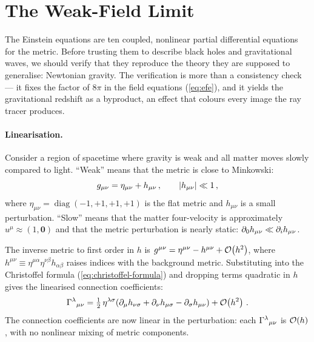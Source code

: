 \section{The Weak-Field Limit}
\label{sec:gr-weak-field}

The Einstein equations are ten coupled, nonlinear partial differential
equations for the metric.  Before trusting them to describe black holes
and gravitational waves, we should verify that they reproduce the theory
they are supposed to generalise: Newtonian gravity.  The verification is
more than a consistency check --- it fixes the factor of $8\pi$ in the
field equations (\cref{eq:efe}), and it yields the gravitational
redshift as a byproduct, an effect that colours every image the ray
tracer produces.

\paragraph{Linearisation.}

Consider a region of spacetime where gravity is weak and all matter
moves slowly compared to light.  ``Weak'' means that the metric is
close to Minkowski:
%
\begin{equation}
  g_{\mu\nu} = \eta_{\mu\nu} + h_{\mu\nu} \,,
  \qquad \left\lvert h_{\mu\nu} \right\rvert \ll 1 \,,
  \label{eq:weak-field-metric}
\end{equation}
%
where $\eta_{\mu\nu} = \operatorname{diag}(-1,+1,+1,+1)$ is the flat
metric and $h_{\mu\nu}$ is a small perturbation.  ``Slow'' means that
the matter four-velocity is approximately
$u^\mu \approx (1,\mathbf{0})$ and that the metric perturbation is
nearly static: $\partial_{0} h_{\mu\nu} \ll \partial_{i} h_{\mu\nu}$.

The inverse metric to first order in $h$ is
$g^{\mu\nu} = \eta^{\mu\nu} - h^{\mu\nu} + \mathcal{O}\!\left(h^2\right)$, where
$h^{\mu\nu} \equiv \eta^{\mu\alpha}\eta^{\nu\beta}h_{\alpha\beta}$
raises indices with the background metric.  Substituting into the
Christoffel formula (\cref{eq:christoffel-formula}) and dropping terms
quadratic in $h$ gives the linearised connection coefficients:
%
\begin{equation}
  \Gamma^{\lambda}{}_{\mu \nu}
    = \tfrac{1}{2}\,\eta^{\lambda\sigma}\!\left(
        \partial_{\mu} h_{\nu\sigma}
      + \partial_{\nu} h_{\mu\sigma}
      - \partial_{\sigma} h_{\mu\nu}
    \right) + \mathcal{O}\!\left(h^2\right) \,.
  \label{eq:christoffel-linearised}
\end{equation}
%
The connection coefficients are now linear in the perturbation: each
$\Gamma^{\lambda}{}_{\mu \nu}$ is $\mathcal{O}\!\left(h\right)$, with no nonlinear
mixing of metric components.

